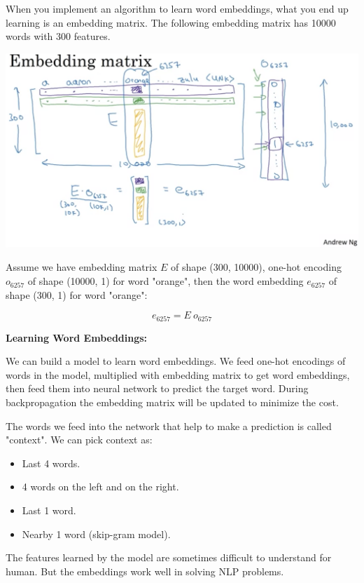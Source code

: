 \documentclass{article}
\begin{document}
\noindent When you implement an algorithm to learn word embeddings, what you end up learning is an embedding matrix. The following embedding matrix has 10000 words with 300 features.

\begin{center}
\includegraphics[scale=0.3]{./images/embedding_matrix.png}
\end{center}

\noindent Assume we have embedding matrix \(E\) of shape (300, 10000), one-hot encoding \(o_{6257}\) of shape (10000, 1) for word "orange", then the word embedding \(e_{6257}\) of shape (300, 1) for word "orange":

\[e_{6257} = E \ o_{6257}\]

\noindent \textbf{Learning Word Embeddings:}

\noindent We can build a model to learn word embeddings. We feed one-hot encodings of words in the model, multiplied with embedding matrix to get word embeddings, then feed them into neural network to predict the target word. During backpropagation the embedding matrix will be updated to minimize the cost.

\bigskip

\noindent The words we feed into the network that help to make a prediction is called "context". We can pick context as:

\begin{itemize}
    \item Last 4 words.
    \item 4 words on the left and on the right.
    \item Last 1 word.
    \item Nearby 1 word (skip-gram model).
\end{itemize}

\noindent The features learned by the model are sometimes difficult to understand for human. But the embeddings work well in solving NLP problems.
\end{document}
